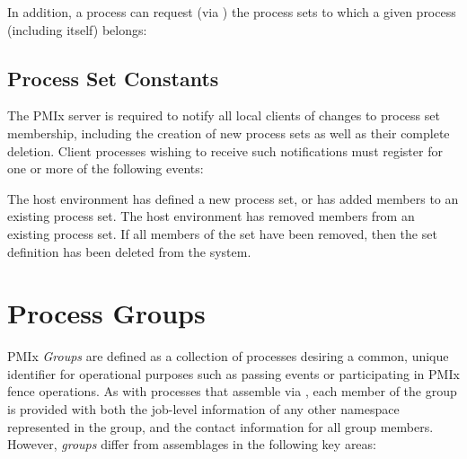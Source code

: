 %

In addition, a process can request (via ) the process sets to which a given process (including itself) belongs:

%

\subsection{Process Set Constants}

The \ac{PMIx} server is required to notify all local clients of changes to
process set membership, including the creation of new process sets as well as
their complete deletion. Client processes wishing to receive such
notifications must register for one or more of the following events:

\begin{constantdesc}
%
The host environment has defined a new process set, or has added members to
an existing process set.
%
The host environment has removed members from an existing process set. If all
members of the set have been removed, then the set definition has been
deleted from the system.
%
\end{constantdesc}



\section{Process Groups}
\label{chap:api_sets_groups:groups}

\ac{PMIx} \emph{Groups} are defined as a collection of processes desiring a common, unique identifier for operational purposes such as passing events or participating in \ac{PMIx} fence operations. As with processes that assemble via , each member of the group is provided with both the job-level information of any other namespace represented in the group, and the contact information for all group members. However, \emph{groups} differ from  assemblages in the following key areas:


